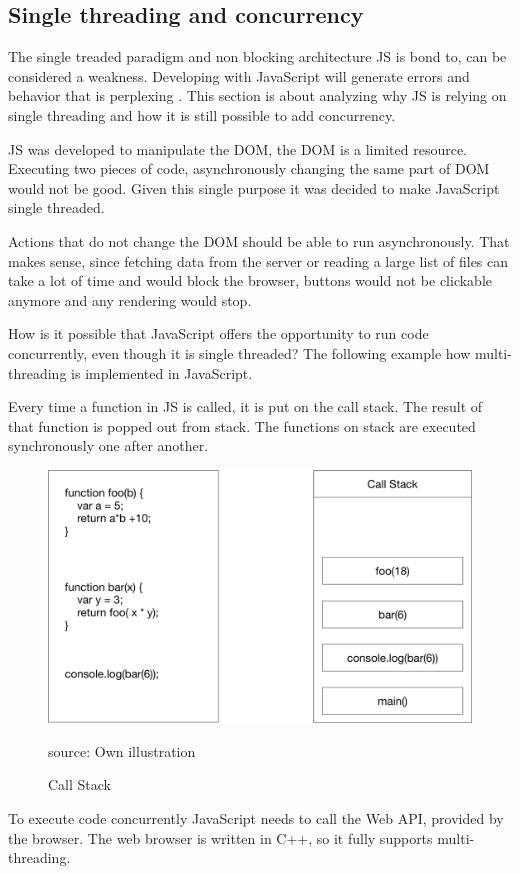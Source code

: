 \subsection{Single threading and concurrency}
The single treaded paradigm and non blocking architecture \gls{JS} is bond to, can be considered a weakness. Developing with JavaScript will generate errors and behavior that is perplexing . This section is about analyzing why \gls{JS} is relying on single threading and how it is still possible to add concurrency. \cite{Steyer2014JavaScript}

\gls{JS} was developed to manipulate the DOM, the DOM is a limited resource. Executing two pieces of code, asynchronously changing the same part of DOM would not be good. Given this single purpose it was decided to make JavaScript single threaded.

Actions that do not change the DOM should be able to run asynchronously. That makes sense, since fetching data from the server or reading a large list of files can take a lot of time and would block the browser, buttons would not be clickable anymore and any rendering would stop. 

How is it possible that JavaScript offers the opportunity to run code concurrently, even though it is single threaded? The following example how multi-threading is implemented in JavaScript.

Every time a function in \gls{JS} is called, it is put on the call stack. The result of that function is popped out from stack. The functions on stack are executed synchronously one after another.

\begin{figure}[H]
	\centering
	\includegraphics[width=0.8\linewidth]{bilder/grundlagen/CallStack.png}
	\caption{Call Stack} source: Own illustration
	\label{fig:CS}
\end{figure}

To execute code concurrently JavaScript needs to call the Web API, provided by the browser. The web browser is written in C++, so it fully supports multi-threading.

